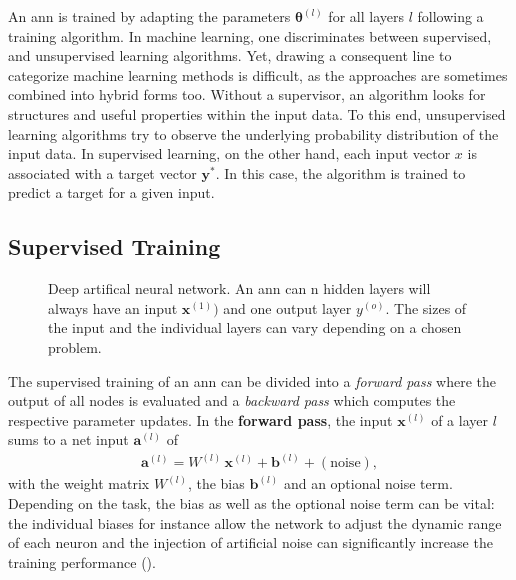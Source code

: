 An \gls{ann} is trained by adapting the parameters $\mathbf{\theta}^{(l)}$ for all layers $l$ following a training algorithm. In machine learning, one discriminates between supervised, and unsupervised learning algorithms. Yet, drawing a consequent line to categorize machine learning methods is difficult, as the approaches are sometimes combined into hybrid forms too. Without a supervisor, an algorithm looks for structures and useful properties within the input data. To this end, unsupervised learning algorithms try to observe the underlying probability distribution of the input data. In supervised learning, on the other hand, each input vector $x$ is associated with a target vector $\textbf{y}^*$. In this case, the algorithm is trained to predict a target for a given input.




\subsection{Supervised Training}
\label{supervisedtraining}
\begin{figure}
	\centering
	
	\caption[Deep artifical neural network]{Deep artifical neural network. An \acrfull{ann} can n hidden layers will always have an input $\mathbf{x}^{(1)})$ and one output layer $y^{(o)}$. The sizes of the input and the individual layers can vary depending on a chosen problem.} 
	\label{multilayernetwork}
\end{figure}
The supervised training of an \gls{ann} can be divided into a \emph{forward pass} where the output of all nodes is evaluated and a \emph{backward pass} which computes the respective parameter updates. In the \textbf{forward pass}, the input $\mathbf{x}^{(l)}$ of a layer $l$ sums to a net input $\mathbf{a}^{(l)}$ of
\begin{align*}
\mathbf{a}^{(l)} = W^{(l)} \, \mathbf{x}^{(l)} + \mathbf{b}^{(l)} + \left(\text{noise}\right), 
\end{align*}
with the weight matrix $W^{(l)}$, the bias $\mathbf{b}^{(l)}$ and an optional noise term. Depending on the task, the bias as well as the optional noise term can be vital: the individual biases for instance allow the network to adjust the dynamic range of each neuron and the injection of artificial noise can significantly increase the training performance (\citealp{an1996effects}).

